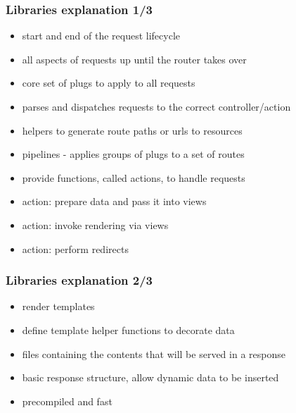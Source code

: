 \begin{frame}
    \frametitle{Libraries explanation 1/3}
    \begin{itemize}
        \item start and end of the request lifecycle
        \item all aspects of requests up until the router takes over
        \item core set of plugs to apply to all requests
    \end{itemize}

    \vfill

    \begin{itemize}
        \item parses and dispatches requests to the correct controller/action
        \item helpers to generate route paths or urls to resources
        \item pipelines - applies groups of plugs to a set of routes
    \end{itemize}

    \vfill

    \begin{itemize}
        \item provide functions, called actions, to handle requests
        \item action: prepare data and pass it into views
        \item action: invoke rendering via views 
        \item action: perform redirects 
    \end{itemize}
\end{frame}

\begin{frame}
    \frametitle{Libraries explanation 2/3}
    \begin{itemize}
        \item render templates
        \item define template helper functions to decorate data
    \end{itemize}

    \vfill

    \begin{itemize}
        \item files containing the contents that will be served in a response
        \item basic response structure, allow dynamic data to be inserted
        \item precompiled and fast
    \end{itemize}
\end{frame}

